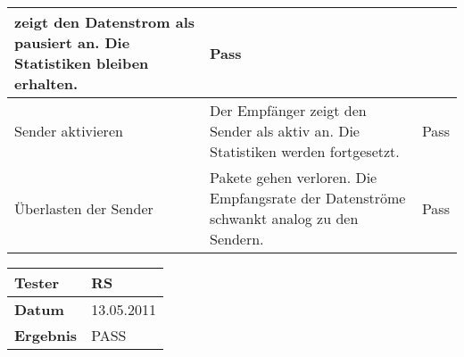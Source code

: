 \begin{table}[h]
\begin{center}
\begin{tabular}{|p{2.5cm}|p{7.55cm}|p{5cm}|}
                    zeigt den Datenstrom als pausiert an. Die Statistiken
                    bleiben erhalten. & Pass\\
                \hline
                    Sender aktivieren & Der Empfänger zeigt den Sender als aktiv an. Die Statistiken
                    werden fortgesetzt. & Pass\\
                \hline
                    Überlasten der Sender & Pakete gehen verloren. Die Empfangsrate der Datenströme schwankt analog
                    zu den Sendern. & Pass\\
                \hline
            \end{tabular}
        \begin{tabular}{|p{3.5cm}|p{11cm}|}
                \textbf{Tester} & RS\\
                \hline
                \textbf{Datum} & 13.05.2011\\
                \hline
                \textbf{Ergebnis} & PASS\\
                \hline
            \end{tabular}
        \end{center}
    \end{table}
    

